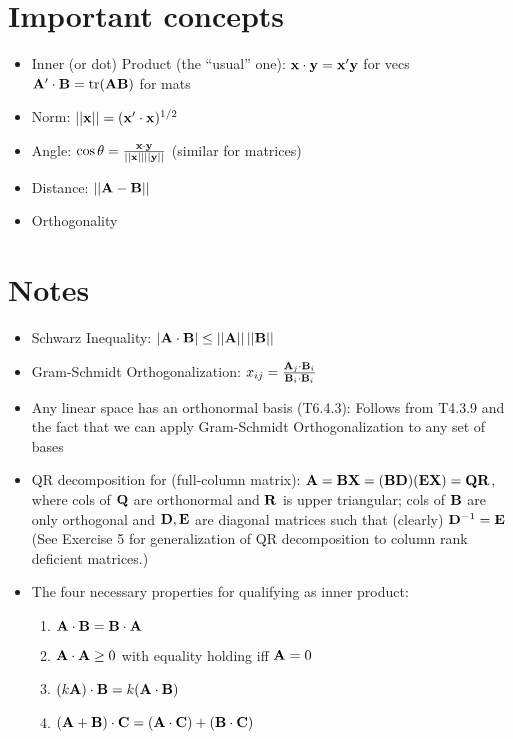 \documentclass[a4paper, oneside]{book}
\begin{document}
\section*{Important concepts}
\begin{itemize}
\item Inner (or dot) Product (the ``usual'' one): $\mathbf{x}\cdot\mathbf{y} = \mathbf{x'y}$ for vecs $\mathbf{A'\cdot B} = \text{tr}(\mathbf{AB})$ for mats
\item Norm: $||\mathbf x|| = (\mathbf{x'\cdot x})^{1/2}$
\item Angle: $\cos \theta = \frac{\mathbf{x \cdot y}}{||\mathbf{x}|| ||\mathbf{y}||}$ (similar for matrices)
\item Distance: $||\mathbf{A-B}||$
\item Orthogonality
\end{itemize}

\section*{Notes}
\begin{itemize}
\item Schwarz Inequality: $|\mathbf{A\cdot B}|\leq ||\mathbf{A}||\,||\mathbf{B}||$
\item Gram-Schmidt Orthogonalization: $x_{ij}=\frac{\mathbf{A}_j\cdot \mathbf{B}_i}{\mathbf{B}_i \cdot \mathbf{B}_i}$
\item Any linear space has an orthonormal basis (T6.4.3): Follows from T4.3.9 and the fact that we can apply Gram-Schmidt Orthogonalization to any set of bases 
\item QR decomposition for (full-column matrix): $\mathbf{A=BX=(BD)(EX)=QR}$, where cols of $\mathbf Q$ are orthonormal and $\mathbf{R}$ is upper triangular; cols of $\mathbf B$ are only orthogonal and $\mathbf{D,E}$ are diagonal matrices such that (clearly) $\mathbf D^{-1} = \mathbf E$ (See Exercise 5 for generalization of QR decomposition to column rank deficient matrices.)
\item The four necessary properties for qualifying as inner product:
	\begin{enumerate}
	\item $\mathbf{A \cdot B = B \cdot A}$
	\item $\mathbf{A \cdot A}\ge 0$  with equality holding iff $\mathbf{A}=0$
	\item $(k\mathbf{A})\cdot \mathbf{B} = k(\mathbf{A\cdot B})$
	\item $(\mathbf{A+B})\cdot \mathbf{C} = \mathbf{(A \cdot C) + (B \cdot C)}$
	\end{enumerate}
\end{itemize}
\end{document}
